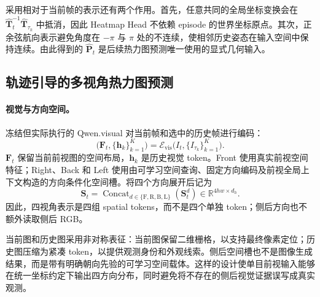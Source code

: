 \documentclass[10pt]{ctexart}
\begin{document}
采用相对于当前帧的表示还有两个作用。首先，任意共同的全局坐标变换会在 $\widehat{\mathbf{T}}_{t}^{-1}\widehat{\mathbf{T}}_{\tau_k}$ 中抵消，因此 Heatmap Head 不依赖 episode 的世界坐标原点。其次，正余弦航向表示避免角度在 $-\pi$ 与 $\pi$ 处的不连续，使相邻历史姿态在输入空间中保持连续。由此得到的 $\widehat{\mathbf{P}}_t$ 是后续热力图预测唯一使用的显式几何输入。

\subsection{轨迹引导的多视角热力图预测}

\paragraph{视觉与方向空间。}
冻结但实际执行的 Qwen.visual 对当前帧和选中的历史帧进行编码：
\begin{equation}
  \bigl(\mathbf{F}_t,\{\mathbf{h}_k\}_{k=1}^{K}\bigr)
  =\mathcal{E}_{\mathrm{vis}}
   \bigl(I_t,\{I_{\tau_k}\}_{k=1}^{K}\bigr).
\end{equation}
$\mathbf{F}_t$ 保留当前前视图的空间布局，$\mathbf{h}_k$ 是历史视觉 token。Front 使用真实前视空间特征；Right、Back 和 Left 使用由可学习空间查询、固定方向编码及前视全局上下文构造的方向条件化空间槽。将四个方向展开后记为
\begin{equation}
  \mathbf{S}_t
  =\operatorname{Concat}_{d\in\{\mathrm{F,R,B,L}\}}
   (\mathbf{S}_t^d)
  \in\mathbb{R}^{4hw\times d_h}.
\end{equation}
因此，四视角表示是四组 spatial tokens，而不是四个单独 token；侧后方向也不额外读取侧后 RGB。

当前图和历史图采用非对称表征：当前图保留二维栅格，以支持最终像素定位；历史图压缩为紧凑 token，以提供观测身份和外观线索。侧后空间槽也不是图像生成结果，而是带有明确朝向先验的可学习空间载体。这样的设计使单目前视输入能够在统一坐标约定下输出四方向分布，同时避免将不存在的侧后视觉证据误写成真实观测。
\end{document}

